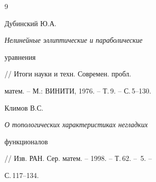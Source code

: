 \begin{thebibliography}{9}


Дубинский Ю.А. {\em Нелинейные эллиптические и параболические 


уравнения} // Итоги науки и техн. Современ. пробл. 


матем. -- М.: ВИНИТИ, 1976. -- Т.\,9. -- С.\,5--130. 




Климов В.С. {\em О топологических характеристиках негладких 


функционалов} // Изв. РАН. Сер. матем. -- 1998. -- Т.\,62. -- \No\,5. -- 


С.\,117--134. 


 


\end{thebibliography} 


 


\vskip 2cm 


 






 


\label{end} 


 


